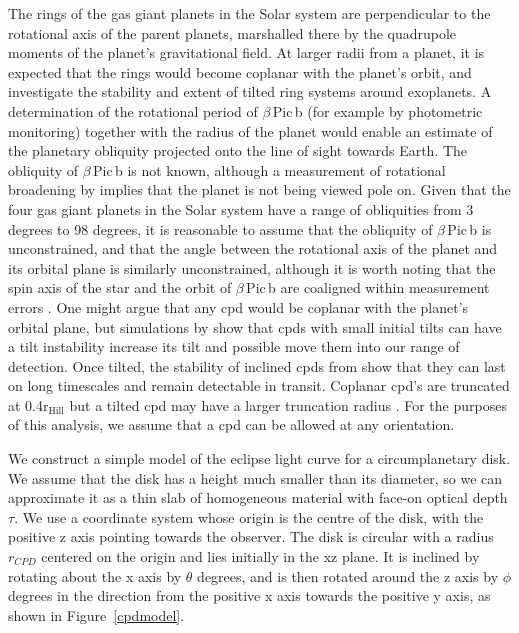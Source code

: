 \documentclass[longauth]{aa} %
\newcommand{\rhill}{$\mathrm{r_{Hill}}$} %
\newcommand{\bpb}{$\beta$\,Pic\,b}
\begin{document}
The rings of the gas giant planets in the Solar system are perpendicular to the rotational axis of the parent planets, marshalled there by the quadrupole moments of the planet's gravitational field.
%
At larger radii from a planet, it is expected that the rings would become coplanar with the planet's orbit, and \citet{Speedie20} investigate the stability and extent of tilted ring systems around exoplanets. 
%
A determination of the rotational period of \bpb{} (for example by photometric monitoring) together with the radius of the planet would enable an estimate of the planetary obliquity projected onto the line of sight towards Earth.
%
The obliquity of \bpb{} is not known, although a measurement of rotational broadening by \citet{Snellen14} implies that the planet is not being viewed pole on.
%
Given that the four gas giant planets in the Solar system have a range of obliquities from 3 degrees to 98 degrees, it is reasonable to assume that the obliquity of \bpb{} is unconstrained, and that the angle between the rotational axis of the planet and its orbital plane is similarly unconstrained, although it is worth noting that the spin axis of the star and the orbit of \bpb{} are coaligned within measurement errors \citep{Kraus20}.
%
One might argue that any \ac{cpd} would be coplanar with the planet's orbital plane, but simulations by \citep{Martin20} show that \ac{cpd}s with small initial tilts can have a tilt instability increase its tilt and possible move them into our range of detection. 
%
Once tilted, the stability of inclined \ac{cpd}s from \citet{Speedie20} show that they can last on long timescales and remain detectable in transit.
%
Coplanar \ac{cpd}'s are truncated at 0.4\rhill{} \citep{Martin11} but a tilted \ac{cpd} may have a larger truncation radius \citep{Lubow15,Miranda15}.
%
For the purposes of this analysis, we assume that a \ac{cpd} can be allowed at any orientation.

We construct a simple model of the eclipse light curve for a circumplanetary disk.
%
We assume that the disk has a height much smaller than its diameter, so we can approximate it as a thin slab of homogeneous material with face-on optical depth $\tau$.
%
We use a coordinate system whose origin is the centre of the disk, with the positive z axis pointing towards the observer.
%
The disk is circular with a radius $r_{CPD}$ centered on the origin and lies initially in the xz plane.
%
It is inclined by rotating about the x axis by $\theta$ degrees, and is then rotated around the z axis by $\phi$ degrees in the direction from the positive x axis towards the positive y axis, as shown in Figure~\ref{cpdmodel}.
\end{document}
